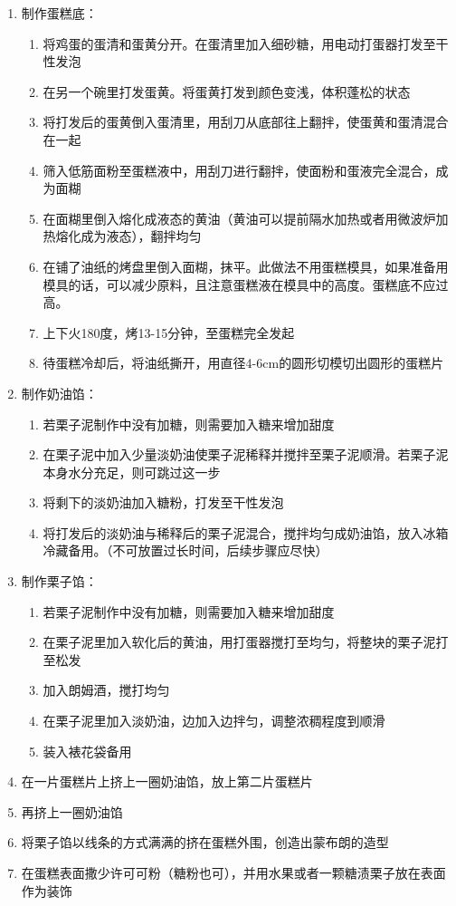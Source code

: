 \begin{enumerate}
    \item 制作蛋糕底：
    \begin{enumerate}
    \item 将鸡蛋的蛋清和蛋黄分开。在蛋清里加入细砂糖，用电动打蛋器打发至干性发泡
    \item 在另一个碗里打发蛋黄。将蛋黄打发到颜色变浅，体积蓬松的状态
    \item 将打发后的蛋黄倒入蛋清里，用刮刀从底部往上翻拌，使蛋黄和蛋清混合在一起
    \item 筛入低筋面粉至蛋糕液中，用刮刀进行翻拌，使面粉和蛋液完全混合，成为面糊
    \item 在面糊里倒入熔化成液态的黄油（黄油可以提前隔水加热或者用微波炉加热熔化成为液态），翻拌均匀
    \item 在铺了油纸的烤盘里倒入面糊，抹平。此做法不用蛋糕模具，如果准备用模具的话，可以减少原料，且注意蛋糕液在模具中的高度。蛋糕底不应过高。
    \item 上下火180度，烤13-15分钟，至蛋糕完全发起
    \item 待蛋糕冷却后，将油纸撕开，用直径4-6cm的圆形切模切出圆形的蛋糕片
    \end{enumerate}
 
    \item 制作奶油馅：
    \begin{enumerate}
    \item 若栗子泥制作中没有加糖，则需要加入糖来增加甜度
    \item 在栗子泥中加入少量淡奶油使栗子泥稀释并搅拌至栗子泥顺滑。若栗子泥本身水分充足，则可跳过这一步
    \item 将剩下的淡奶油加入糖粉，打发至干性发泡
    \item 将打发后的淡奶油与稀释后的栗子泥混合，搅拌均匀成奶油馅，放入冰箱冷藏备用。（不可放置过长时间，后续步骤应尽快）
    \end{enumerate}
    
    \item 制作栗子馅：
    \begin{enumerate}
    \item 若栗子泥制作中没有加糖，则需要加入糖来增加甜度
    \item 在栗子泥里加入软化后的黄油，用打蛋器搅打至均匀，将整块的栗子泥打至松发
    \item 加入朗姆酒，搅打均匀
    \item 在栗子泥里加入淡奶油，边加入边拌匀，调整浓稠程度到顺滑
    \item 装入裱花袋备用
    \end{enumerate}
    
    \item 在一片蛋糕片上挤上一圈奶油馅，放上第二片蛋糕片
    \item 再挤上一圈奶油馅
    \item 将栗子馅以线条的方式满满的挤在蛋糕外围，创造出蒙布朗的造型
    \item 在蛋糕表面撒少许可可粉（糖粉也可），并用水果或者一颗糖渍栗子放在表面作为装饰
    
\end{enumerate}


